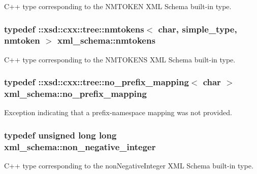 C++ type corresponding to the N\+M\+T\+O\+K\+E\+N X\+M\+L Schema built-\/in type. 

\hypertarget{namespacexml__schema_af680cdfd739686fb9b689667435092f8}{}
\subsubsection[{nmtokens}]{\setlength{\rightskip}{0pt plus 5cm}typedef \+::xsd\+::cxx\+::tree\+::nmtokens$<$ char, {\bf simple\+\_\+type}, {\bf nmtoken} $>$ {\bf xml\+\_\+schema\+::nmtokens}}\label{namespacexml__schema_af680cdfd739686fb9b689667435092f8}


C++ type corresponding to the N\+M\+T\+O\+K\+E\+N\+S X\+M\+L Schema built-\/in type. 

\hypertarget{namespacexml__schema_a03293581f2c90a05fbb910be49380e01}{}
\subsubsection[{no\+\_\+prefix\+\_\+mapping}]{\setlength{\rightskip}{0pt plus 5cm}typedef \+::xsd\+::cxx\+::tree\+::no\+\_\+prefix\+\_\+mapping$<$ char $>$ {\bf xml\+\_\+schema\+::no\+\_\+prefix\+\_\+mapping}}\label{namespacexml__schema_a03293581f2c90a05fbb910be49380e01}


Exception indicating that a prefix-\/namespace mapping was not provided. 

\hypertarget{namespacexml__schema_af42ef5911d65f41a0a03598b056f05aa}{}
\subsubsection[{non\+\_\+negative\+\_\+integer}]{\setlength{\rightskip}{0pt plus 5cm}typedef unsigned long long {\bf xml\+\_\+schema\+::non\+\_\+negative\+\_\+integer}}\label{namespacexml__schema_af42ef5911d65f41a0a03598b056f05aa}


C++ type corresponding to the non\+Negative\+Integer X\+M\+L Schema built-\/in type. 

